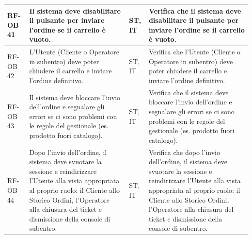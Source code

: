 \documentclass[a4paper,11pt,oneside]{scrartcl}
\begin{document}
\begin{longtable}{|p{1.5cm}|p{4.5cm}|p{1.8cm}|p{6cm}|}
    RF-OB 41         & Il sistema deve disabilitare il pulsante per inviare l'ordine se il carrello è vuoto.                                                                                                                                                                                                                 & ST, IT             & Verifica che il sistema deve disabilitare il pulsante per inviare l'ordine se il carrello è vuoto.                                                                                                                                                                                                                 \\ \hline
    RF-OB 42         & L'Utente (Cliente o Operatore in subentro) deve poter chiudere il carrello e inviare l'ordine definitivo.                                                                                                                                                                                             & ST, IT             & Verifica che l'Utente (Cliente o Operatore in subentro) deve poter chiudere il carrello e inviare l'ordine definitivo.                                                                                                                                                                                             \\ \hline
    RF-OB 43         & Il sistema deve bloccare l'invio dell'ordine e segnalare gli errori se ci sono problemi con le regole del gestionale (es. prodotto fuori catalogo).                                                                                                                                                   & ST, IT             & Verifica che il sistema deve bloccare l'invio dell'ordine e segnalare gli errori se ci sono problemi con le regole del gestionale (es. prodotto fuori catalogo).                                                                                                                                                   \\ \hline
    RF-OB 44         & Dopo l'invio dell'ordine, il sistema deve svuotare la sessione e reindirizzare l'Utente alla vista appropriata al proprio ruolo: il Cliente allo Storico Ordini, l'Operatore alla chiusura del ticket e dismissione della console di subentro.                                                        & ST, IT             & Verifica che dopo l'invio dell'ordine, il sistema deve svuotare la sessione e reindirizzare l'Utente alla vista appropriata al proprio ruolo: il Cliente allo Storico Ordini, l'Operatore alla chiusura del ticket e dismissione della console di subentro.                                                        \\ \hline

\end{longtable}
\end{document}
